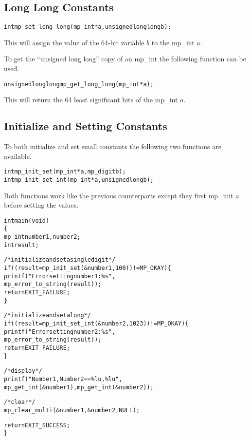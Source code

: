 \documentclass[synpaper]{book}
\begin{document}
\subsection{Long Long Constants}

\begin{alltt}
int mp_set_long_long (mp_int * a, unsigned long long b);
\end{alltt}

This will assign the value of the 64-bit variable $b$ to the mp\_int $a$.

To get the ``unsigned long long'' copy of an mp\_int the following function can be used.

\begin{alltt}
unsigned long long mp_get_long_long (mp_int * a);
\end{alltt}

This will return the 64 least significant bits of the mp\_int $a$.

\subsection{Initialize and Setting Constants}
To both initialize and set small constants the following two functions are available.
 
\begin{alltt}
int mp_init_set (mp_int * a, mp_digit b);
int mp_init_set_int (mp_int * a, unsigned long b);
\end{alltt}

Both functions work like the previous counterparts except they first mp\_init $a$ before setting the values.

\begin{alltt}
int main(void)
\{
   mp_int number1, number2;
   int    result;

   /* initialize and set a single digit */
   if ((result = mp_init_set(&number1, 100)) != MP_OKAY) \{
      printf("Error setting number1: \%s",
             mp_error_to_string(result));
      return EXIT_FAILURE;
   \}

   /* initialize and set a long */
   if ((result = mp_init_set_int(&number2, 1023)) != MP_OKAY) \{
      printf("Error setting number2: \%s",
             mp_error_to_string(result));
      return EXIT_FAILURE;
   \}

   /* display */
   printf("Number1, Number2 == \%lu, \%lu",
          mp_get_int(&number1), mp_get_int(&number2));

   /* clear */
   mp_clear_multi(&number1, &number2, NULL);

   return EXIT_SUCCESS;
\}
\end{alltt}
\end{document}
